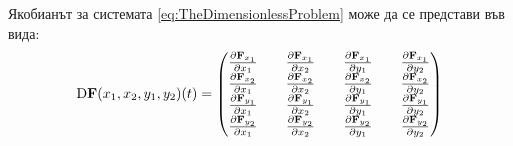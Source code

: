 
Якобианът за системата \ref{eq:TheDimensionlessProblem} може да се представи във вида:
\begin{equation}
  \mathrm{D} \mathbf{F}(x_1, x_2, y_1, y_2)(t) =
  \begin{pmatrix}
    \pdv{\mathbf{F}_{x_1}}{x_1} && \pdv{\mathbf{F}_{x_1}}{x_2} && \pdv{\mathbf{F}_{x_1}}{y_1} && \pdv{\mathbf{F}_{x_1}}{y_2} \\
    \pdv{\mathbf{F}_{x_2}}{x_1} && \pdv{\mathbf{F}_{x_2}}{x_2} && \pdv{\mathbf{F}_{x_2}}{y_1} && \pdv{\mathbf{F}_{x_2}}{y_2} \\
    \pdv{\mathbf{F}_{y_1}}{x_1} && \pdv{\mathbf{F}_{y_1}}{x_2} && \pdv{\mathbf{F}_{y_1}}{y_1} && \pdv{\mathbf{F}_{y_1}}{y_2} \\
    \pdv{\mathbf{F}_{y_2}}{x_1} && \pdv{\mathbf{F}_{y_2}}{x_2} && \pdv{\mathbf{F}_{y_2}}{y_1} && \pdv{\mathbf{F}_{y_2}}{y_2}
    \end{pmatrix}
    \end{equation}

